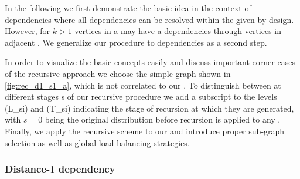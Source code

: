 In the following we first demonstrate the basic idea in the context of \DONE dependencies where all dependencies can be resolved within the given \levelGroup by design. However, for $k>1$ vertices in a \levelGroup may have a \DK dependencies through vertices in adjacent \levelGroups. We generalize our procedure to \DK dependencies as a second step.

In order to visualize the basic concepts easily and discuss important corner cases of the recursive approach we choose the simple graph shown in \cref{fig:rec_d1_s1_a}, which is not correlated to our \stex. To distinguish between \levelGroups at different stages \acrshort{s} of our recursive procedure we add a subscript to the levels (\acrshort{L_si}) and \levelGroups (\acrshort{T_si}) indicating the stage of recursion at which they are generated, with $s=0$ being the original distribution before recursion is applied to any \subgraph. Finally, we apply the recursive scheme to our \stex and introduce proper sub-graph selection as well as global load balancing strategies.

	
	\subsubsection{Distance-$1$ dependency}

